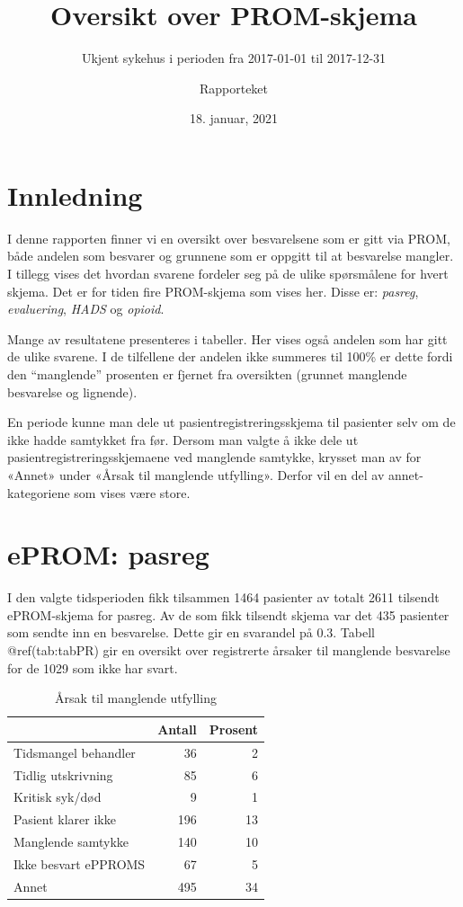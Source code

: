\documentclass[
]{article}
\title{Oversikt over PROM-skjema}
\subtitle{Ukjent sykehus i perioden fra 2017-01-01 til 2017-12-31}
\author{Rapporteket}
\date{18. januar, 2021}
\begin{document}
\maketitle

\hypertarget{innledning}{%
\section{Innledning}\label{innledning}}

I denne rapporten finner vi en oversikt over besvarelsene som er gitt
via PROM, både andelen som besvarer og grunnene som er oppgitt til at
besvarelse mangler. I tillegg vises det hvordan svarene fordeler seg på
de ulike spørsmålene for hvert skjema. Det er for tiden fire PROM-skjema
som vises her. Disse er: \emph{pasreg}, \emph{evaluering}, \emph{HADS}
og \emph{opioid}.

Mange av resultatene presenteres i tabeller. Her vises også andelen som
har gitt de ulike svarene. I de tilfellene der andelen ikke summeres til
100\% er dette fordi den ``manglende'' prosenten er fjernet fra
oversikten (grunnet manglende besvarelse og lignende).

En periode kunne man dele ut pasientregistreringsskjema til pasienter
selv om de ikke hadde samtykket fra før. Dersom man valgte å ikke dele
ut pasientregistreringsskjemaene ved manglende samtykke, krysset man av
for «Annet» under «Årsak til manglende utfylling». Derfor vil en del av
annet-kategoriene som vises være store.

\hypertarget{eprom-pasreg}{%
\section{ePROM: pasreg}\label{eprom-pasreg}}

I den valgte tidsperioden fikk tilsammen 1464 pasienter av totalt 2611
tilsendt ePROM-skjema for pasreg. Av de som fikk tilsendt skjema var det
435 pasienter som sendte inn en besvarelse. Dette gir en svarandel på
0.3. Tabell @ref(tab:tabPR) gir en oversikt over registrerte årsaker til
manglende besvarelse for de 1029 som ikke har svart.

\begin{table}

\caption{\label{tab:tabPR}Årsak til manglende utfylling}
\centering
\begin{tabular}[t]{l|r|r}
\hline
 & Antall  & Prosent\\
\hline
Tidsmangel behandler & 36 & 2\\
\hline
Tidlig utskrivning & 85 & 6\\
\hline
Kritisk syk/død & 9 & 1\\
\hline
Pasient klarer ikke & 196 & 13\\
\hline
Manglende samtykke & 140 & 10\\
\hline
Ikke besvart ePPROMS & 67 & 5\\
\hline
Annet & 495 & 34\\
\hline
\end{tabular}
\end{table}
\end{document}
